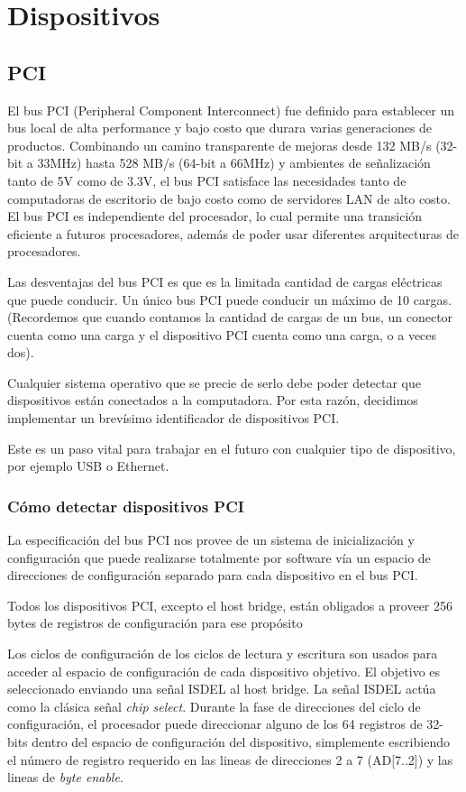 \chapter{Dispositivos}

\section{PCI}

El bus PCI (Peripheral Component Interconnect) fue definido para establecer un bus local de alta performance y bajo costo que durara varias generaciones de productos.
Combinando un camino transparente de mejoras desde 132 MB/s (32-bit a 33MHz) hasta 528 MB/s (64-bit a 66MHz) y ambientes de señalización tanto de 5V como de 3.3V, el bus PCI satisface las necesidades tanto de computadoras de escritorio de bajo costo como de servidores LAN de alto costo.
El bus PCI es independiente del procesador, lo cual permite una transición eficiente a futuros procesadores, además de poder usar diferentes arquitecturas de procesadores.

Las desventajas del bus PCI es que es la limitada cantidad de cargas eléctricas que puede conducir. Un único bus PCI puede conducir un máximo de 10 cargas. (Recordemos que cuando contamos la cantidad de cargas de un bus, un conector cuenta como una carga y el dispositivo PCI cuenta como una carga, o a veces dos).

Cualquier sistema operativo que se precie de serlo debe poder detectar que dispositivos están conectados a la computadora. Por esta razón, decidimos implementar un brevísimo identificador de dispositivos PCI.

Este es un paso vital para trabajar en el futuro con cualquier tipo de dispositivo, por ejemplo USB o Ethernet.

\subsection{Cómo detectar dispositivos PCI}

La especificación del bus PCI nos provee de un sistema de inicialización y configuración que puede realizarse totalmente por software vía un espacio de direcciones de configuración separado para cada dispositivo en el bus PCI.

Todos los dispositivos PCI, excepto el host bridge, están obligados a proveer 256 bytes de registros de configuración para ese propósito

Los ciclos de configuración de los ciclos de lectura y escritura son usados para acceder al espacio de configuración de cada dispositivo objetivo. El objetivo es seleccionado enviando una señal ISDEL al host bridge. La señal ISDEL actúa como la clásica señal \emph{chip select}. Durante la fase de direcciones del ciclo de configuración, el procesador puede direccionar alguno de los 64 registros de 32-bits dentro del espacio de configuración del dispositivo, simplemente escribiendo el número de registro requerido en las lineas de direcciones 2 a 7 (AD[7..2]) y las lineas de \emph{byte enable}.

